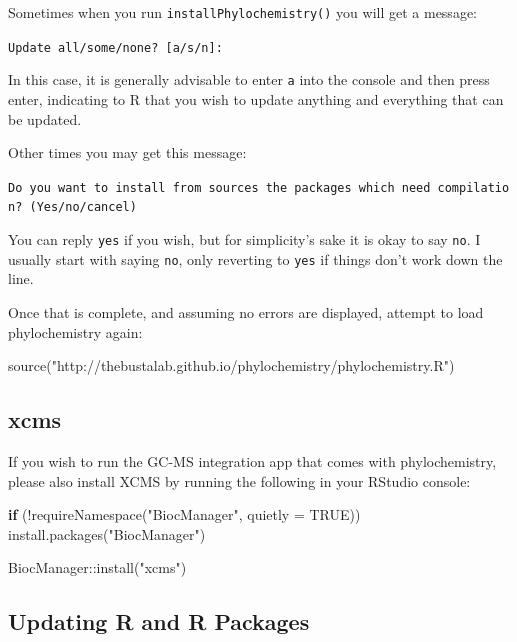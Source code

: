 \documentclass[
]{krantz}
\newenvironment{Shaded}{\begin{snugshade}}{\end{snugshade}}
\newcommand{\AttributeTok}[1]{\textcolor[rgb]{0.77,0.63,0.00}{#1}}
\newcommand{\ConstantTok}[1]{\textcolor[rgb]{0.00,0.00,0.00}{#1}}
\newcommand{\ControlFlowTok}[1]{\textcolor[rgb]{0.13,0.29,0.53}{\textbf{#1}}}
\newcommand{\FunctionTok}[1]{\textcolor[rgb]{0.00,0.00,0.00}{#1}}
\newcommand{\NormalTok}[1]{#1}
\newcommand{\SpecialCharTok}[1]{\textcolor[rgb]{0.00,0.00,0.00}{#1}}
\newcommand{\StringTok}[1]{\textcolor[rgb]{0.31,0.60,0.02}{#1}}
\begin{document}
Sometimes when you run \texttt{installPhylochemistry()} you will get a message:

\texttt{Update\ all/some/none?\ {[}a/s/n{]}:}

In this case, it is generally advisable to enter \texttt{a} into the console and then press enter, indicating to R that you wish to update anything and everything that can be updated.

Other times you may get this message:

\texttt{Do\ you\ want\ to\ install\ from\ sources\ the\ packages\ which\ need\ compilation?\ (Yes/no/cancel)}

You can reply \texttt{yes} if you wish, but for simplicity's sake it is okay to say \texttt{no}. I usually start with saying \texttt{no}, only reverting to \texttt{yes} if things don't work down the line.

Once that is complete, and assuming no errors are displayed, attempt to load phylochemistry again:

\begin{Shaded}
\begin{Highlighting}[]
\FunctionTok{source}\NormalTok{(}\StringTok{"http://thebustalab.github.io/phylochemistry/phylochemistry.R"}\NormalTok{)}
\end{Highlighting}
\end{Shaded}

\hypertarget{xcms}{%
\subsection{xcms}\label{xcms}}

If you wish to run the GC-MS integration app that comes with phylochemistry, please also install XCMS by running the following in your RStudio console:

\begin{Shaded}
\begin{Highlighting}[]
\ControlFlowTok{if}\NormalTok{ (}\SpecialCharTok{!}\FunctionTok{requireNamespace}\NormalTok{(}\StringTok{"BiocManager"}\NormalTok{, }\AttributeTok{quietly =} \ConstantTok{TRUE}\NormalTok{))}
    \FunctionTok{install.packages}\NormalTok{(}\StringTok{"BiocManager"}\NormalTok{)}

\NormalTok{BiocManager}\SpecialCharTok{::}\FunctionTok{install}\NormalTok{(}\StringTok{"xcms"}\NormalTok{)}
\end{Highlighting}
\end{Shaded}

\hypertarget{updating-r-and-r-packages}{%
\subsection{Updating R and R Packages}\label{updating-r-and-r-packages}}
\end{document}
